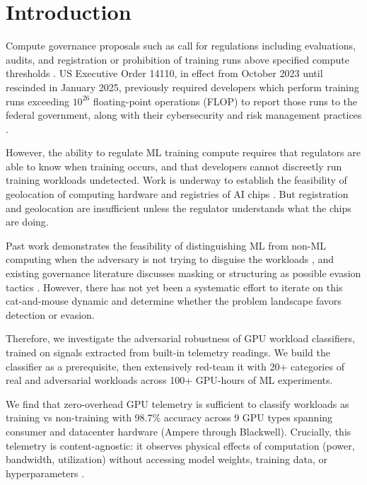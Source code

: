 \section{Introduction}

Compute governance proposals such as \citep{shavit2023,baker2025,scher2025} call for regulations including evaluations, audits, and registration or prohibition of training runs above specified compute thresholds \citep{heimkoessler2024}. US Executive Order 14110, in effect from October 2023 until rescinded in January 2025, previously required developers which perform training runs exceeding $10^{26}$ floating-point operations (FLOP) to report those runs to the federal government, along with their cybersecurity and risk management practices \citep{whitehouse2023}.

However, the ability to regulate ML training compute requires that regulators are able to know when training occurs, and that developers cannot discreetly run training workloads undetected. Work is underway to establish the feasibility of geolocation of computing hardware \citep{brass2025} and registries of AI chips \citep{fist2023}. But registration and geolocation are insufficient unless the regulator understands what the chips are doing.

Past work demonstrates the feasibility of distinguishing ML from non-ML computing when the adversary is not trying to disguise the workloads \citep{tang2022,weakley2025}, and existing governance literature discusses masking or structuring as possible evasion tactics \citep{heim2024,seferis2025}. However, there has not yet been a systematic effort to iterate on this cat-and-mouse dynamic and determine whether the problem landscape favors detection or evasion.

Therefore, we investigate the adversarial robustness of GPU workload classifiers, trained on signals extracted from built-in telemetry readings. We build the classifier as a prerequisite, then extensively red-team it with 20+ categories of real and adversarial workloads across 100+ GPU-hours of ML experiments.

We find that zero-overhead GPU telemetry is sufficient to classify workloads as training vs non-training with 98.7\% accuracy across 9 GPU types spanning consumer and datacenter hardware (Ampere through Blackwell). Crucially, this telemetry is content-agnostic: it observes physical effects of computation (power, bandwidth, utilization) without accessing model weights, training data, or hyperparameters \citep{shavit2023,ogara2025}.

